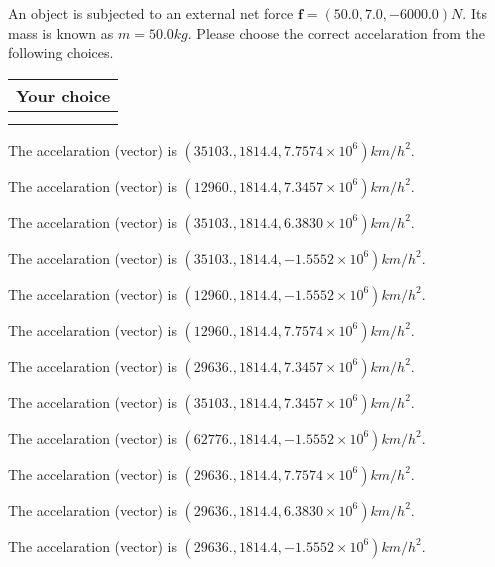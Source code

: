 \documentclass[12pt]{article}
\begin{document}
An object is subjected to an external net force $\mathbf{f}=(
50.0 ,
7.0,
-6000.0  )N$. Its mass is known as
$m= %
50.0  kg$. Please choose the correct accelaration
from the following choices.
 
  
  
\noindent\hspace{3.0in} \begin{tabular}{|l|}
\hline
Your choice \\
\hline
 \\ 
 \\ 
\hline
\end{tabular}
  
  
 
 
The accelaration (vector) is
$(
35103.,
1814.4 ,
7.7574 \times 10^{6}
)km/h^2.
$
 
 
The accelaration (vector) is
$(
12960.,
1814.4 ,
7.3457 \times 10^{6}
)km/h^2.
$
 
 
The accelaration (vector) is
$(
35103.,
1814.4 ,
6.3830 \times 10^{6}
)km/h^2.
$
 
 
The accelaration (vector) is
$(
35103.,
1814.4 ,
-1.5552 \times 10^{6}
)km/h^2.
$
 
 
The accelaration (vector) is
$(
12960.,
1814.4 ,
-1.5552 \times 10^{6}
)km/h^2.
$
 
 
The accelaration (vector) is
$(
12960.,
1814.4 ,
7.7574 \times 10^{6}
)km/h^2.
$
 
 
The accelaration (vector) is
$(
29636.,
1814.4 ,
7.3457 \times 10^{6}
)km/h^2.
$
 
 
The accelaration (vector) is
$(
35103.,
1814.4 ,
7.3457 \times 10^{6}
)km/h^2.
$
 
 
The accelaration (vector) is
$(
62776.,
1814.4 ,
-1.5552 \times 10^{6}
)km/h^2.
$
 
 
The accelaration (vector) is
$(
29636.,
1814.4 ,
7.7574 \times 10^{6}
)km/h^2.
$
 
 
The accelaration (vector) is
$(
29636.,
1814.4 ,
6.3830 \times 10^{6}
)km/h^2.
$
 
 
The accelaration (vector) is
$(
29636.,
1814.4 ,
-1.5552 \times 10^{6}
)km/h^2.
$
 
\end{document}
